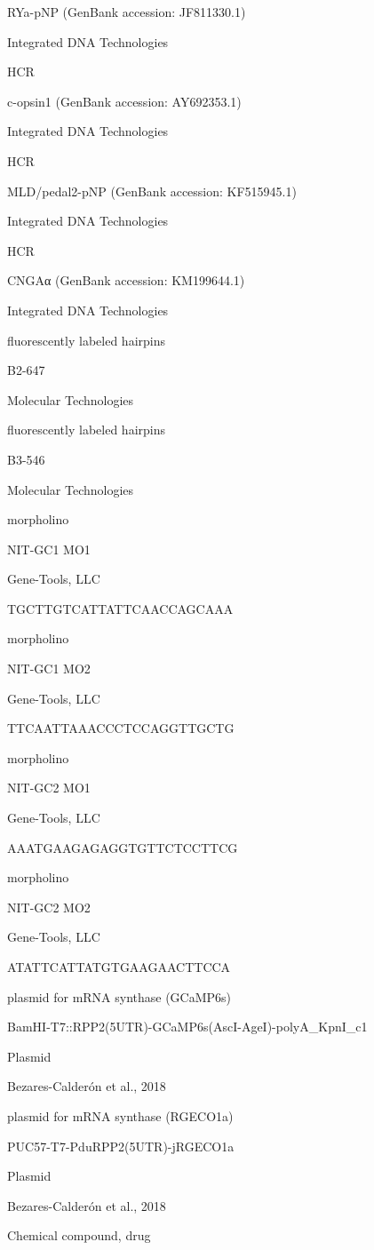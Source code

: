 \documentclass[
  10pt,
  onecolumn]{article}
\begin{document}
RYa-pNP (GenBank accession: JF811330.1)

Integrated DNA Technologies

HCR

c-opsin1 (GenBank accession: AY692353.1)

Integrated DNA Technologies

HCR

MLD/pedal2-pNP (GenBank accession: KF515945.1)

Integrated DNA Technologies

HCR

CNGAα (GenBank accession: KM199644.1)

Integrated DNA Technologies

fluorescently labeled hairpins

B2-647

Molecular Technologies

fluorescently labeled hairpins

B3-546

Molecular Technologies

morpholino

NIT-GC1 MO1

Gene-Tools, LLC

TGCTTGTCATTATTCAACCAGCAAA

morpholino

NIT-GC1 MO2

Gene-Tools, LLC

TTCAATTAAACCCTCCAGGTTGCTG

morpholino

NIT-GC2 MO1

Gene-Tools, LLC

AAATGAAGAGAGGTGTTCTCCTTCG

morpholino

NIT-GC2 MO2

Gene-Tools, LLC

ATATTCATTATGTGAAGAACTTCCA

plasmid for mRNA synthase (GCaMP6s)

BamHI-T7::RPP2(5UTR)-GCaMP6s(AscI-AgeI)-polyA\_KpnI\_c1

Plasmid

Bezares-Calderón et al., 2018

plasmid for mRNA synthase (RGECO1a)

PUC57-T7-PduRPP2(5UTR)-jRGECO1a

Plasmid

Bezares-Calderón et al., 2018

Chemical compound, drug
\end{document}
